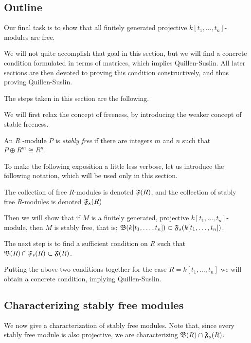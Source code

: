 \subsection{Outline}

Our final task is to show that all finitely generated projective $k[t_1, \dots, t_n]$-modules are free.

We will not quite accomplish that goal in this section, but we will find a concrete condition formulated in terms of matrices, which implies Quillen-Suslin.
All later sections are then devoted to proving this condition constructively, and thus proving Quillen-Suslin.

The steps taken in this section are the following.

We will first relax the concept of freeness, by introducing the weaker concept of stable freeness.

\begin{definition}
\label{def:stablyfree}
  An $R$ -module $P$ is \emph{stably free} if there are integers $m$ and $n$ such that $P \oplus R^m \cong R^n$.
\end{definition}

To make the following exposition a little less verbose, let us introduce the following notation, which will be used only in this section.

\begin{notation}
  The collection of free $R$-modules is denoted $\mathfrak F(R)$, and the collection of stably free $R$-modules is denoted $\mathfrak{F}_s(R)$
\end{notation}

Then we will show that if $M$ is a finitely generated, projective $k[t_1, \dots, t_n]$-module, then $M$ is stably free, that is; $\mathfrak B(k[t_1, \dots, t_n]) \subset \mathfrak{F}_s(k[t_1,\dots, t_n])$.

The next step is to find a sufficient condition on $R$ such that $\mathfrak B(R) \cap \mathfrak{F}_s(R) \subset \mathfrak F(R)$.

Putting the above two conditions together for the case $R = k[t_1, \dots, t_n]$ we will obtain a concrete condition, implying Quillen-Suslin.

\subsection{Characterizing stably free modules}

We now give a characterization of stably free modules.
Note that, since every stably free module is also projective, we are characterizing $\mathfrak B(R) \cap \mathfrak{F}_s(R)$.

